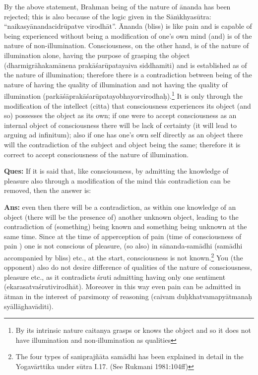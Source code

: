 By the above statement, Brahman being of the nature of ānanda has been rejected; this is also because of the logic given in the Sāṁkhyasūtra: “naikasyānandacidrūpatve virodhāt”. Ānanda (bliss) is like pain and is capable of being experienced without being a modification of one’s own  mind (and) is of the nature of non-illumination. Consciousness, on the other hand, is of the nature of illumination alone, having the purpose of grasping the object (dharmigrāhakamānena prakāśarūpatayaiva siddhamiti) and is established as of the nature of illumination; therefore there is a contradiction between being of the nature of having the quality of illumination and not having the quality of illumination (parkāśāprakāśarūpatayobhayorvirodhaḥ).\footnote{By its intrinsic nature caitanya grasps or knows the object and so it does not have illumination and non-illumination as qualities} It is only through the modification of the intellect (citta) that consciousness experiences its object (and so) possesses the object as its own; if one were to accept consciousness as an internal object of consciousness there will be lack of certainty (it will lead to arguing ad infinitum); also if one has one’s own self directly as an object there will the contradiction of the subject and object being the same; therefore it is correct to accept consciousness of the nature of illumination. 

\textbf{Ques:} If it is said that, like consciousness, by admitting the knowledge of pleasure also through a modification of the mind this contradiction can be removed, then the answer is: 

\textbf{Ans:} even then there will be a contradiction, as within one knowledge of an object (there will be the presence of) another unknown object, leading to the contradiction of (something) being known and something being unknown at the same time. Since at the time of apperception of pain (time of consciousness of pain ) one is not conscious of pleasure, (so also)  in sānanda-samādhi (samādhi accompanied by bliss) etc., at the start, consciousness is not known.\footnote{The four types of saṁprajñāta samādhi has been explained in detail in the Yogavārttika under sūtra I.17.
(See Rukmani 1981:104ff)} You (the opponent) also do not  desire difference of qualities of the nature of consciousness, pleasure etc., as it contradicts śruti admitting having only one sentiment (ekarasatvaśrutivirodhāt). Moreover in this way even pain can be admitted in ātman in the interest of parsimony of reasoning (caivam duḥkhatvamapyātmanaḥ syāllāghavāditi). 

